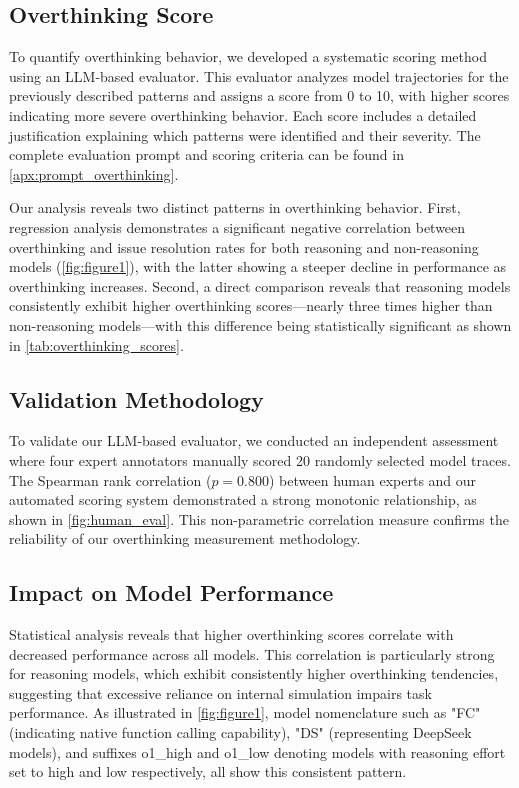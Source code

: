 \subsection{Overthinking Score}
To quantify overthinking behavior, we developed a systematic scoring method using an LLM-based evaluator. This evaluator analyzes model trajectories for the previously described patterns and assigns a score from 0 to 10, with higher scores indicating more severe overthinking behavior. Each score includes a detailed justification explaining which patterns were identified and their severity. The complete evaluation prompt and scoring criteria can be found in \cref{apx:prompt_overthinking}.

Our analysis reveals two distinct patterns in overthinking behavior. First, regression analysis demonstrates a significant negative correlation between overthinking and issue resolution rates for both reasoning and non-reasoning models (\cref{fig:figure1}), with the latter showing a steeper decline in performance as overthinking increases. Second, a direct comparison reveals that reasoning models consistently exhibit higher overthinking scores—nearly three times higher than non-reasoning models—with this difference being statistically significant as shown in \cref{tab:overthinking_scores}.

\subsection{Validation Methodology}
To validate our LLM-based evaluator, we conducted an independent assessment where four expert annotators manually scored 20 randomly selected model traces. The Spearman rank correlation ($p = 0.800$) between human experts and our automated scoring system demonstrated a strong monotonic relationship, as shown in \cref{fig:human_eval}. This non-parametric correlation measure confirms the reliability of our overthinking measurement methodology.

\subsection{Impact on Model Performance}
Statistical analysis reveals that higher overthinking scores correlate with decreased performance across all models. This correlation is particularly strong for reasoning models, which exhibit consistently higher overthinking tendencies, suggesting that excessive reliance on internal simulation impairs task performance. As illustrated in \cref{fig:figure1}, model nomenclature such as "FC" (indicating native function calling capability), "DS" (representing DeepSeek models), and suffixes o1\_high and o1\_low denoting models with reasoning effort set to high and low respectively, all show this consistent pattern.

